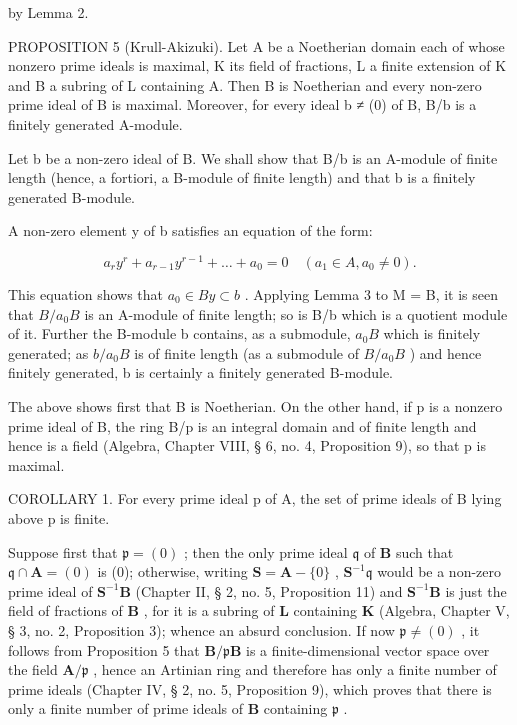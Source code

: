 by Lemma 2.

PROPOSITION 5 (Krull-Akizuki). Let A be a Noetherian domain each of whose nonzero prime ideals is maximal, K its field of fractions, L a finite extension of K and B a subring of L containing A. Then B is Noetherian and every non-zero prime ideal of B is maximal. Moreover, for every ideal b ≠ (0) of B, B/b is a finitely generated A-module.

Let b be a non-zero ideal of B. We shall show that B/b is an A-module of finite length (hence, a fortiori, a B-module of finite length) and that b is a finitely generated B-module.

A non-zero element y of b satisfies an equation of the form:

\[
a _ {r} y ^ {r} + a _ {r - 1} y ^ {r - 1} + \dots + a _ {0} = 0 \quad (a _ {1} \in A, a _ {0} \neq 0).
\]

This equation shows that \(a_{0} \in By \subset b\) . Applying Lemma 3 to M = B, it is seen that \(B/a_{0}B\) is an A-module of finite length; so is B/b which is a quotient module of it. Further the B-module b contains, as a submodule, \(a_{0}B\) which is finitely generated; as \(b/a_{0}B\) is of finite length (as a submodule of \(B/a_{0}B\) ) and hence finitely generated, b is certainly a finitely generated B-module.

The above shows first that B is Noetherian. On the other hand, if p is a nonzero prime ideal of B, the ring B/p is an integral domain and of finite length and hence is a field (Algebra, Chapter VIII, § 6, no. 4, Proposition 9), so that p is maximal.

COROLLARY 1. For every prime ideal p of A, the set of prime ideals of B lying above p is finite.

Suppose first that \(\mathfrak{p} = (0)\) ; then the only prime ideal \(\mathfrak{q}\) of \(\mathbf{B}\) such that \(\mathfrak{q} \cap \mathbf{A} = (0)\) is (0); otherwise, writing \(\mathbf{S} = \mathbf{A} - \{0\}\) , \(\mathbf{S}^{-1}\mathfrak{q}\) would be a non-zero prime ideal of \(\mathbf{S}^{-1}\mathbf{B}\) (Chapter II, § 2, no. 5, Proposition 11) and \(\mathbf{S}^{-1}\mathbf{B}\) is just the field of fractions of \(\mathbf{B}\) , for it is a subring of \(\mathbf{L}\) containing \(\mathbf{K}\) (Algebra, Chapter V, § 3, no. 2, Proposition 3); whence an absurd conclusion. If now \(\mathfrak{p} \neq (0)\) , it follows from Proposition 5 that \(\mathbf{B}/\mathfrak{p}\mathbf{B}\) is a finite-dimensional vector space over the field \(\mathbf{A}/\mathfrak{p}\) , hence an Artinian ring and therefore has only a finite number of prime ideals (Chapter IV, § 2, no. 5, Proposition 9), which proves that there is only a finite number of prime ideals of \(\mathbf{B}\) containing \(\mathfrak{p}\) .

